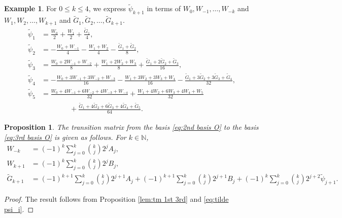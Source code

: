\documentclass[11pt]{article}%
\theoremstyle{definition}
\newtheorem{example}[definition]{Example}
\theoremstyle{plain}
\newtheorem{proposition}[definition]{Proposition}
\begin{document}
\begin{example}
For $0 \leq k \leq 4$, we express $\tilde\psi_{k+1}$ in terms of $W_0, W_{-1}, \ldots, W_{-k}$ and $W_1, W_2, \ldots, W_{k+1}$ and $\tilde G_1, \tilde G_2, \ldots, \tilde G_{k+1}$.
\begin{align*}
	\tilde\psi_1 & = \frac{W_0}{2} + \frac{W_1}{2} + \frac{\tilde G_1}{4}, \\[2pt]
	\tilde\psi_2 & = -\frac{W_0 + W_{-1}}{4} - \frac{W_1 + W_2}{4} - \frac{\tilde G_1 + \tilde G_2}{8}, \\[2pt]
	\tilde\psi_3 & = \frac{W_0 + 2W_{-1} + W_{-2}}{8} + \frac{W_1 + 2W_2 + W_3}{8} + \frac{\tilde G_1 + 2\tilde G_2 + \tilde G_3}{16}, \\[2pt]
	\tilde\psi_4 & = -\frac{W_0 + 3W_{-1} + 3W_{-2} + W_{-3}}{16} - \frac{W_1 + 3W_2 + 3W_3 + W_4}{16}  - \frac{\tilde G_1 + 3\tilde G_2 + 3\tilde G_3 + \tilde G_4}{32}, \\[2pt]
	\tilde\psi_5 & = \frac{W_0 + 4W_{-1} + 6W_{-2} + 4W_{-3} + W_{-4}}{32} 
	+ \frac{W_1 + 4W_2 + 6W_3 + 4W_4 + W_5}{32} \\
	& \qquad \qquad + \frac{\tilde G_1 + 4\tilde G_2 + 6\tilde G_3 + 4\tilde G_4 + \tilde G_5}{64}.
\end{align*}
\end{example}


\begin{proposition}\label{lem:tm 2nd 3rd}
The transition matrix from the basis \eqref{eq:2nd basis O} to the basis \eqref{eq:3rd basis O} is given as follows.
For $k \in \mathbb{N}$,
\begin{align*}
	W_{-k} & = (-1)^k \sum_{j=0}^k  {k \choose j} 2^j A_{j}, \\
	W_{k+1} & = (-1)^k \sum_{j=0}^k  {k \choose j} 2^j B_{j}, \\
	\tilde{G}_{k+1}
	& = 	(-1)^{k+1} \sum_{j=0}^k  {k \choose j} 2^{j+1} A_j
		+ (-1)^{k+1} \sum_{j=0}^k  {k \choose j} 2^{j+1} B_j
		+ (-1)^{k} \sum_{j=0}^k  {k \choose j} 2^{j+2} \tilde\psi_{j+1}. 
\end{align*}
\end{proposition}
\begin{proof}
The result follows from Proposition \ref{lem:tm 1st 3rd} and \eqref{eq:tilde psi_i}.
\end{proof}
\end{document}

